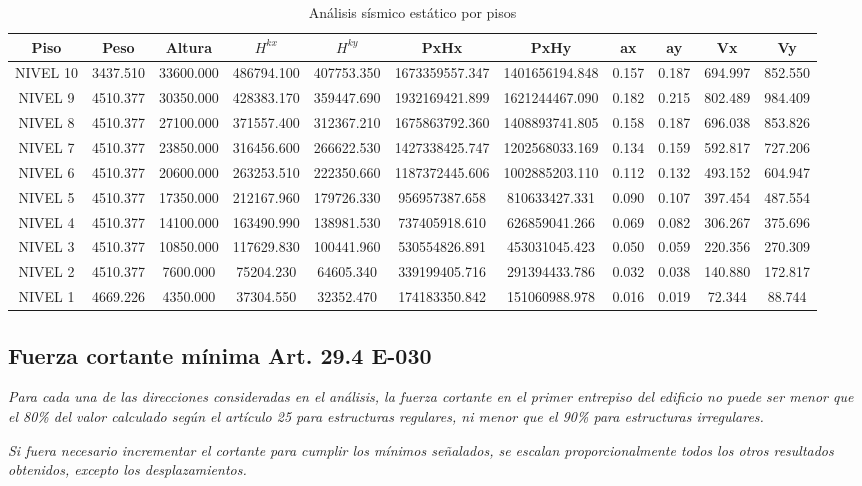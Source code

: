 \documentclass{article}%
\begin{document}
%


\begin{table}[H]%
\centering%
\caption{Análisis sísmico estático por pisos}%
\begin{tabular}{ccccccccccc}
\toprule
Piso & Peso & Altura & $H^{kx}$ & $H^{ky}$ & PxHx & PxHy & ax & ay & Vx & Vy \\
\midrule
NIVEL 10 & 3437.510 & 33600.000 & 486794.100 & 407753.350 & 1673359557.347 & 1401656194.848 & 0.157 & 0.187 & 694.997 & 852.550 \\
NIVEL 9 & 4510.377 & 30350.000 & 428383.170 & 359447.690 & 1932169421.899 & 1621244467.090 & 0.182 & 0.215 & 802.489 & 984.409 \\
NIVEL 8 & 4510.377 & 27100.000 & 371557.400 & 312367.210 & 1675863792.360 & 1408893741.805 & 0.158 & 0.187 & 696.038 & 853.826 \\
NIVEL 7 & 4510.377 & 23850.000 & 316456.600 & 266622.530 & 1427338425.747 & 1202568033.169 & 0.134 & 0.159 & 592.817 & 727.206 \\
NIVEL 6 & 4510.377 & 20600.000 & 263253.510 & 222350.660 & 1187372445.606 & 1002885203.110 & 0.112 & 0.132 & 493.152 & 604.947 \\
NIVEL 5 & 4510.377 & 17350.000 & 212167.960 & 179726.330 & 956957387.658 & 810633427.331 & 0.090 & 0.107 & 397.454 & 487.554 \\
NIVEL 4 & 4510.377 & 14100.000 & 163490.990 & 138981.530 & 737405918.610 & 626859041.266 & 0.069 & 0.082 & 306.267 & 375.696 \\
NIVEL 3 & 4510.377 & 10850.000 & 117629.830 & 100441.960 & 530554826.891 & 453031045.423 & 0.050 & 0.059 & 220.356 & 270.309 \\
NIVEL 2 & 4510.377 & 7600.000 & 75204.230 & 64605.340 & 339199405.716 & 291394433.786 & 0.032 & 0.038 & 140.880 & 172.817 \\
NIVEL 1 & 4669.226 & 4350.000 & 37304.550 & 32352.470 & 174183350.842 & 151060988.978 & 0.016 & 0.019 & 72.344 & 88.744 \\
\bottomrule
\end{tabular}
%
\end{table}

%
\subsection{Fuerza cortante mínima Art. 29.4 E{-}030}%
\label{subsec:FuerzacortantemnimaArt.29.4E{-}030}%
\begin{tcolorbox}[colback=gray!5!white,colframe=cyan!75!black,fonttitle=\bfseries,title=Art. 29.4.1]%
\textit{Para cada una de las direcciones consideradas en el análisis, la fuerza cortante en el primer entrepiso del edificio no puede ser menor que el 80\% del valor calculado según el artículo 25 para estructuras regulares, ni menor que el 90\% para estructuras irregulares.}%
\end{tcolorbox}%
\begin{tcolorbox}[colback=gray!5!white,colframe=cyan!75!black,fonttitle=\bfseries,title=Art. 29.4.2]%
\textit{Si fuera necesario incrementar el cortante para cumplir los mínimos señalados,  se escalan proporcionalmente todos los otros resultados obtenidos, excepto los  desplazamientos.}%
\end{tcolorbox}%
\end{document}
